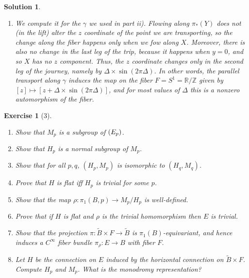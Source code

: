 \documentclass{article}
\theoremstyle{plain}
\newtheorem*{ex}{Exercise}
\theoremstyle{nonumberplain}
\newtheorem{sol}{Solution}
\newcommand{\R}{\mathbb{R}}
\newcommand{\Z}{\mathbb{Z}}
\let\Diff\relax
\DeclareMathOperator{\Diff}{Diff}
\begin{document}
\begin{sol}
\begin{enumerate}
\begin{enumerate}[label=\roman*)]
As such, starting from $X$ and $Y$ as in i) we could prove without computation that $\hat\alpha \wedge \dl \hat\alpha \neq 0$ by plugging in $Z = [X,Y]$. On the other hand, it is also possible (but I don't want to write the details) to, starting from the fact that $\hat\alpha \wedge \dl \hat\alpha$, finding $X,Y$ in the kernel of $\alpha$ such that (for some $Z$) $\hat\alpha(Z) \hat\alpha([X,Y]) \neq 0$, and in particular $[X,Y] \neq 0$.

\item We compute it for the $\gamma$ we used in part ii). Flowing along $\pi_*(Y)$ does not (in the lift) alter the $z$ coordinate of the point we are transporting, so the change along the fiber happens only when we fow along $X$. Moreover, there is also no change in the last leg of the trip, because it happens when $y = 0$, and so $X$ has no $z$ component. Thus, the $z$ coordinate changes only in the second leg of the journey, namely by $\Delta \times \sin(2\pi\Delta)$. In other words, the parallel transport along $\gamma$ induces the map on the fiber $F = S^1 = \R/\Z$ given by $[z] \mapsto [z + \Delta \times \sin(2\pi\Delta)]$, and for most values of $\Delta$ this is a nonzero automorphism of the fiber.
\end{enumerate}
\end{enumerate}
\end{sol}

\begin{ex}[3]
\leavevmode
\begin{enumerate}
\item Show that $M_p$ is a subgroup of $\Diff(E_p)$.
\item Show that $H_p$ is a normal subgroup of $M_p$.
\item Show that for all $p,q$, $(H_p,M_p)$ is isomorphic to $(H_q,M_q)$.
\item Prove that $H$ is flat iff $H_p$ is trivial for some $p$.
\item Show that the map $\rho \colon \pi_1(B,p) \to M_p/H_p$ is well-defined.
\item Prove that if $H$ is flat and $\rho$ is the trivial homomorphism then $E$ is trivial.
\item Show that the projection $\pi \colon \widetilde B \times F \to \widetilde B$ is $\pi_1(B)$-equivariant, and hence induces a $C^\infty$ fiber bundle $\pi_\rho \colon E \to B$ with fiber $F$.
\item Let $H$ be the connection on $E$ induced by the horizontal connection on $\widetilde B \times F$. Compute $H_p$ and $M_p$. What is the monodromy representation?
\end{enumerate}
\end{ex}
\end{document}
